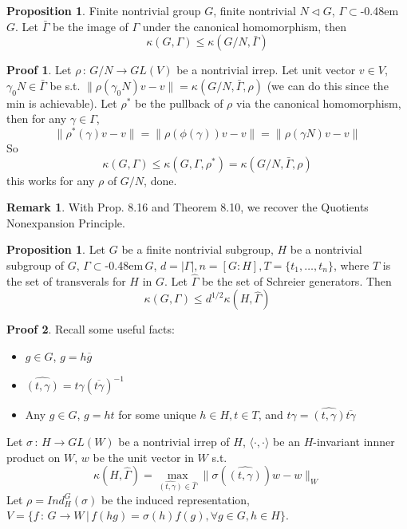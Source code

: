 \documentclass{book}
\newcommand{\syin}{$\subset$\kern-0.48em\raisebox{.20ex}{\tiny S}$\,$}
\newcommand{\inner}[1]{\langle #1 \rangle}
\newcommand{\norm}[1]{\lVert #1 \rVert}
\newcommand{\abs}[1]{\lvert #1 \rvert }
\theoremstyle{definition}
\newtheorem{proposition}[lemma]{Proposition}
\theoremstyle{remarkstyle}
\newtheorem*{remark}{Remark}%
\newtheorem*{myproof}{Proof}%
\begin{document}
\begin{proposition}
    Finite nontrivial group $G$, finite nontrivial $N\vartriangleleft G$, $\Gamma$\syin $G$. Let $\bar{\Gamma}$ be the image of $\Gamma$ under the canonical homomorphism, then 
    $$
    \kappa(G,\Gamma) \le \kappa(G/N, \bar{\Gamma})
    $$
\end{proposition}
\begin{myproof}
    Let $\rho\,:\,G/N\rightarrow GL(V)$ be a nontrivial irrep. Let unit vector $v\in V$, $\gamma_0N\in \bar{\Gamma}$ be s.t. $\norm{\rho(\gamma_0N)v-v}=\kappa(G/N,\bar{\Gamma},\rho)$ (we can do this since the min is achievable). Let $\rho^*$ be the pullback of $\rho$ via the canonical homomorphism, then for any $\gamma\in\Gamma$, 
    $$
    \norm{\rho^*(\gamma)v-v} = \norm{\rho(\phi(\gamma))v-v} = \norm{\rho(\gamma N)v-v}
    $$
    So 
    $$
    \kappa(G,\Gamma) \le \kappa(G,\Gamma,\rho^*) = \kappa(G/N,\bar{\Gamma},\rho)
    $$
    this works for any $\rho$ of $G/N$, done. 
\end{myproof}
\begin{remark}
    With Prop. 8.16 and Theorem 8.10, we recover the Quotients Nonexpansion Principle. \newline 
\end{remark}

\begin{proposition}
    Let $G$ be a finite nontrivial subgroup, $H$ be a nontrivial subgroup of $G$, $\Gamma$\syin $G$, $d=\abs{\Gamma}, n=[G:H], T=\{t_1,\dots,t_n\}$, where $T$ is the set of transverals for $H$ in $G$. Let $\hat{\Gamma}$ be the set of Schreier generators. Then 
    $$
    \kappa(G,\Gamma) \le d^{1/2}\kappa(H,\hat{\Gamma})
    $$
\end{proposition}
\begin{myproof}
    Recall some useful facts:
    \begin{itemize}
        \item $g\in G$, $g = h\overline{g}$
        \item $\widehat{(t,\gamma)} = t\gamma(\overline{t\gamma})^{-1} $
        \item Any $g\in G$, $g=ht$ for some unique $h\in H, t\in T $, and $t\gamma = \widehat{(t,\gamma)}\overline{t\gamma} $
    \end{itemize}
\end{myproof}

Let $\sigma\,:\,H\rightarrow GL(W)$ be a nontrivial irrep of $H$, $\inner{\cdot,\cdot}$ be an $H$-invariant innner product on $W$, $w$ be the unit vector in $W$ s.t. 
$$
\kappa(H,\hat{\Gamma}) = \max_{\widehat{(t,\gamma)}\in\hat{\Gamma}} \norm{\sigma(\widehat{(t,\gamma)})w -w}_W
$$
Let $\rho=Ind^G_H(\sigma)$ be the induced representation, $V=\{f\,:\, G\rightarrow W \,\lvert\, f(hg) = \sigma(h)f(g), \forall g\in G, h\in H\} $. \newline 
\end{document}
